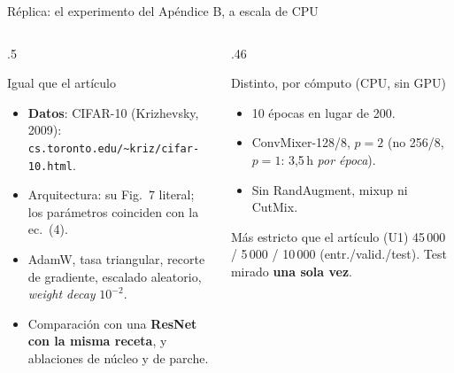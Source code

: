 \begin{frame}{Réplica: el experimento del Apéndice B, a escala de CPU}
  \begin{columns}[T]
    \begin{column}{.5\textwidth}
      \begin{block}{Igual que el artículo}
        \footnotesize
        \begin{itemize}
          \item \textbf{Datos}: CIFAR-10 (Krizhevsky, 2009): \texttt{cs.toronto.edu/\textasciitilde kriz/cifar-10.html}.
          \item Arquitectura: su Fig.~7 literal; los parámetros coinciden con la ec.~(4).
          \item AdamW, tasa triangular, recorte de gradiente, escalado aleatorio, \emph{weight decay} $10^{-2}$.
          \item Comparación con una \textbf{ResNet con la misma receta}, y ablaciones de núcleo y de parche.
        \end{itemize}
      \end{block}
    \end{column}
    \begin{column}{.46\textwidth}
      \begin{alertblock}{Distinto, por cómputo (CPU, sin GPU)}
        \footnotesize
        \begin{itemize}
          \item 10 épocas en lugar de 200.
          \item ConvMixer-128/8, $p=2$ (no 256/8, $p=1$: 3,5\,h \emph{por época}).
          \item Sin RandAugment, mixup ni CutMix.
        \end{itemize}
      \end{alertblock}
      \vspace{3pt}
      \begin{exampleblock}{Más estricto que el artículo (U1)}
        \footnotesize 45\,000 / 5\,000 / 10\,000 (entr./valid./test). Test mirado \textbf{una sola vez}.
      \end{exampleblock}
    \end{column}
  \end{columns}
\end{frame}

